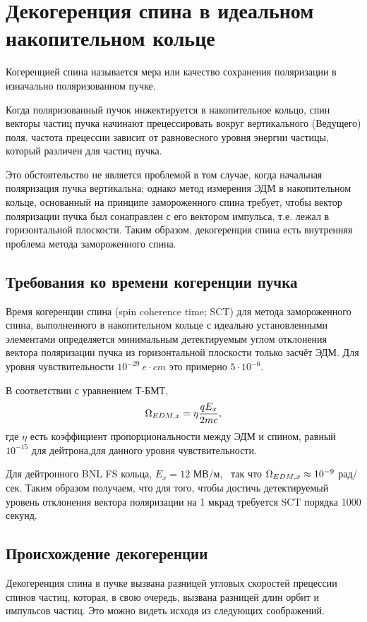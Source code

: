 \documentclass{report}
\begin{document}
\section{Декогеренция спина в идеальном накопительном кольце}
Когеренцией спина называется мера или качество сохранения поляризации
в изначально поляризованном пучке.~\citep[стр.~205]{Eremey:Thesis}

Когда поляризованный пучок инжектируется в накопительное кольцо, спин
векторы частиц пучка начинают прецессировать вокруг вертикального
(Ведущего) поля. частота прецессии зависит от равновесного уровня
энергии частицы, который различен для частиц пучка.

Это обстоятельство не является проблемой в том случае, когда начальная
поляризация пучка вертикальна; однако метод измерения ЭДМ в
накопительном кольце, основанный
на принципе замороженного спина требует, чтобы вектор поляризации
пучка был сонаправлен с его вектором импульса, т.е. лежал в
горизонтальной плоскости. Таким образом, декогеренция спина есть
внутренняя проблема метода замороженного спина.
\subsection{Требования ко времени когеренции пучка}
Время когеренции спина (spin coherence time; SCT) для метода
замороженного спина, выполненного в накопительном кольце с идеально
установленными элементами определяется минимальным детектируемым углом
отклонения вектора поляризации пучка из горизонтальной плоскости
только засчёт ЭДМ. Для уровня чувствительности $10^{-29}~e\cdot cm$
это примерно $5\cdot10^{-6}$.~\cite{BNL:Deuteron2008}

В соответствии с уравнением Т-БМТ,
\[
\Omega_{EDM,x} = \eta\frac{qE_x}{2mc},
\]
где $\eta$ есть коэффициент пропорциональности между ЭДМ и спином,
равный $10^{-15}$ для дейтрона,для данного уровня чувствительности.~\citep[p.~206]{Eremey:Thesis}

Для дейтронного BNL FS кольца, $E_x = 12$
МВ/м,~\citep[p.~19]{BNL:Deuteron2008} так что $\Omega_{EDM,x}\approx
10^{-9}$ рад/сек. Таким образом получаем, что для того, чтобы достичь
детектируемый уровень отклонения вектора поляризации на 1 мкрад требуется SCT порядка 1000 секунд.~\citep[p.~207]{Eremey:Thesis}
\subsection{Происхождение декогеренции}
Декогеренция спина в пучке вызвана разницей угловых скоростей
прецессии спинов частиц, которая, в свою очередь, вызвана разницей
длин орбит и импульсов частиц. Это можно видеть исходя из следующих
соображений.
\end{document}
